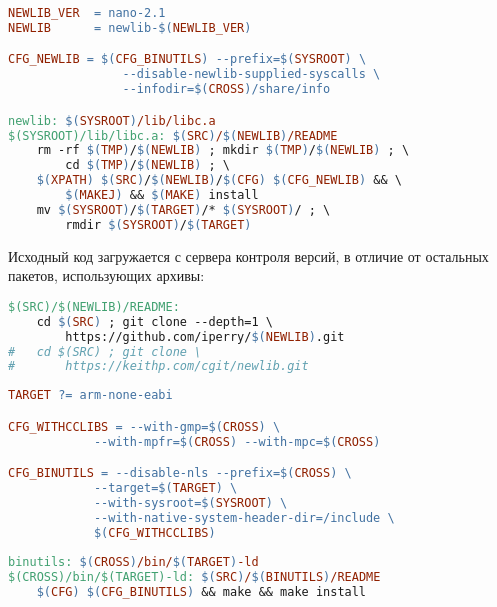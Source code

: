 \clearpage
\begin{lstlisting}[language=make]
NEWLIB_VER	= nano-2.1
NEWLIB		= newlib-$(NEWLIB_VER)

CFG_NEWLIB = $(CFG_BINUTILS) --prefix=$(SYSROOT) \
				--disable-newlib-supplied-syscalls \
				--infodir=$(CROSS)/share/info

newlib: $(SYSROOT)/lib/libc.a
$(SYSROOT)/lib/libc.a: $(SRC)/$(NEWLIB)/README
	rm -rf $(TMP)/$(NEWLIB) ; mkdir $(TMP)/$(NEWLIB) ; \
		cd $(TMP)/$(NEWLIB) ; \
	$(XPATH) $(SRC)/$(NEWLIB)/$(CFG) $(CFG_NEWLIB) && \
		$(MAKEJ) && $(MAKE) install
	mv $(SYSROOT)/$(TARGET)/* $(SYSROOT)/ ; \
		rmdir $(SYSROOT)/$(TARGET)
\end{lstlisting}
\clearpage
Исходный код \file{newlib} загружается с сервера контроля версий, в отличие от
остальных пакетов, использующих архивы:
\begin{lstlisting}[language=make]
$(SRC)/$(NEWLIB)/README:
	cd $(SRC) ; git clone --depth=1 \
		https://github.com/iperry/$(NEWLIB).git
#	cd $(SRC) ; git clone \
#		https://keithp.com/cgit/newlib.git
\end{lstlisting}

\clearpage
\begin{lstlisting}[language=make]
TARGET ?= arm-none-eabi

CFG_WITHCCLIBS = --with-gmp=$(CROSS) \
			--with-mpfr=$(CROSS) --with-mpc=$(CROSS)

CFG_BINUTILS = --disable-nls --prefix=$(CROSS) \
			--target=$(TARGET) \
			--with-sysroot=$(SYSROOT) \
			--with-native-system-header-dir=/include \
			$(CFG_WITHCCLIBS)
 
binutils: $(CROSS)/bin/$(TARGET)-ld
$(CROSS)/bin/$(TARGET)-ld: $(SRC)/$(BINUTILS)/README
	$(CFG) $(CFG_BINUTILS) && make && make install
\end{lstlisting}
